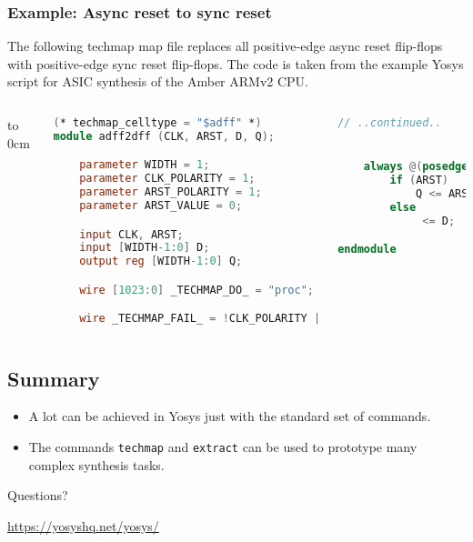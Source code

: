 \subsubsection{Example: Async reset to sync reset}

\begin{frame}[t, fragile]{\subsubsecname}
The following techmap map file replaces all positive-edge async reset flip-flops with
positive-edge sync reset flip-flops. The code is taken from the example Yosys script
for ASIC synthesis of the Amber ARMv2 CPU.

\begin{columns}
\column[t]{6cm}
\vbox to 0cm{
\begin{lstlisting}[basicstyle=\ttfamily\fontsize{8pt}{10pt}\selectfont, language=Verilog]
(* techmap_celltype = "$adff" *)
module adff2dff (CLK, ARST, D, Q);

    parameter WIDTH = 1;
    parameter CLK_POLARITY = 1;
    parameter ARST_POLARITY = 1;
    parameter ARST_VALUE = 0;

    input CLK, ARST;
    input [WIDTH-1:0] D;
    output reg [WIDTH-1:0] Q;

    wire [1023:0] _TECHMAP_DO_ = "proc";

    wire _TECHMAP_FAIL_ = !CLK_POLARITY || !ARST_POLARITY;
\end{lstlisting}
\vss}
\column[t]{4cm}
\begin{lstlisting}[basicstyle=\ttfamily\fontsize{8pt}{10pt}\selectfont, language=Verilog]
// ..continued..


    always @(posedge CLK)
        if (ARST)
            Q <= ARST_VALUE;
        else
             <= D;

endmodule
\end{lstlisting}
\end{columns}

\end{frame}


\subsection{Summary}

\begin{frame}{\subsecname}
\begin{itemize}
\item A lot can be achieved in Yosys just with the standard set of commands.
\item The commands {\tt techmap} and {\tt extract} can be used to prototype many complex synthesis tasks.
\end{itemize}

\bigskip
\bigskip
\begin{center}
Questions?
\end{center}

\bigskip
\bigskip
\begin{center}
\url{https://yosyshq.net/yosys/}
\end{center}
\end{frame}

